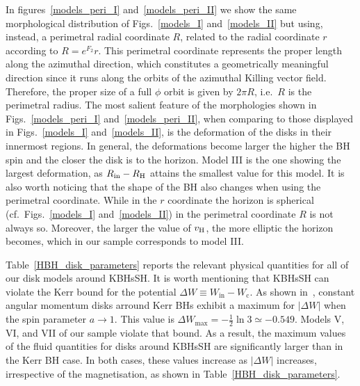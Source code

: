 \documentclass[twocolumn,aps,showpacs,showkeys,prd,superscriptaddress,byrevtex, amsmath]{revtex4-1}
\begin{document}
In figures~\ref{models_peri_I} and~\ref{models_peri_II} we show the same morphological distribution of Figs.~\ref{models_I} and~\ref{models_II} but using, instead, a perimetral radial coordinate $R$, related to the radial coordinate $r$ according to $R = e^{F_2} r$. This perimetral coordinate represents the proper length along the azimuthal direction, which constitutes a geometrically meaningful direction since it runs along the orbits of the azimuthal Killing vector field. Therefore, the proper size of a full $\phi$ orbit is given by $2\pi R$, i.e.~$R$ is the perimetral radius. The most salient feature of the morphologies shown in Figs.~\ref{models_peri_I} and~\ref{models_peri_II}, when comparing to those displayed in Figs.~\ref{models_I} and~\ref{models_II}, is the deformation of the disks in their innermost regions. In general, the deformations become larger the higher the BH spin and the closer the disk is to the horizon. Model III is the one showing the largest deformation, as $R_{\rm in}-R_{\rm H}$ attains the smallest value for this model.  It is also worth noticing that the shape of the BH also changes when using the perimetral coordinate. While in the $r$ coordinate the horizon is spherical (cf.~Figs.~\ref{models_I} and~\ref{models_II}) in the perimetral coordinate $R$ is not always so. Moreover, the larger the value of $v_{\rm H}$, the more elliptic the horizon becomes, which in our sample corresponds to model III. 

 

Table~\ref{HBH_disk_parameters} reports the relevant physical quantities for all of our disk models around KBHsSH. It is worth mentioning that KBHsSH can violate the Kerr bound for the potential $\Delta W \equiv W_{\mathrm{in}} - W_{\mathrm{c}}$. As shown in~\cite{Abramowicz:1978}, constant angular momentum disks arround Kerr BHs exhibit a maximum for $|\Delta W|$ when the spin parameter $a\rightarrow 1$. This value is $\Delta W_{\mathrm{max}} = -\frac{1}{2} \ln 3 \simeq -0.549$. Models V, VI, and VII of our sample violate that bound. As a result, the maximum values of the fluid quantities for disks around KBHsSH are significantly larger than in the Kerr BH case. In both cases, these values increase as $|\Delta W|$ increases, irrespective of the magnetisation, as shown in Table~\ref{HBH_disk_parameters}.
\end{document}

